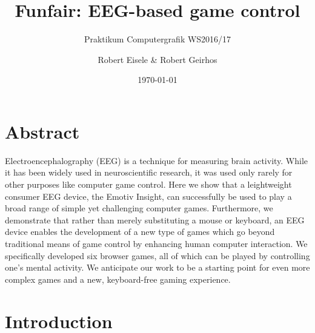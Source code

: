 \documentclass{utue} %
\title{Funfair: EEG-based game control}
\author{Robert Eisele \& Robert Geirhos}
\date{\today}
\subtitle{Praktikum Computergrafik WS2016/17}
\begin{document}

\maketitle

\section*{Abstract}

Electroencephalography (EEG) is a technique for measuring brain activity. While it has been widely used in neuroscientific research, it was used only rarely for other purposes like computer game control. Here we show that a leightweight consumer EEG device, the Emotiv Insight, can successfully be used to play a broad range of simple yet challenging computer games. Furthermore, we demonstrate that rather than merely substituting a mouse or keyboard, an EEG device enables the development of a new type of games which go beyond traditional means of game control by enhancing human computer interaction. We specifically developed six browser games, all of which can be played by controlling one's mental activity. We anticipate our work to be a starting point for even more complex games and a new, keyboard-free gaming experience.




\section{Introduction}
\end{document}
